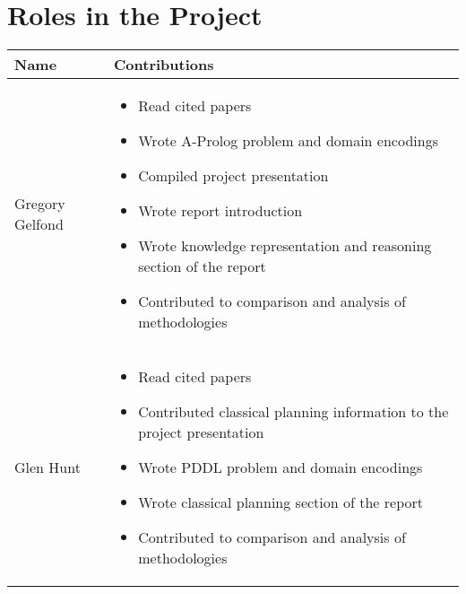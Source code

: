 \section{Roles in the Project}
\begin{tabularx}{\textwidth}{lX}
    \textbf{Name} & \textbf{Contributions} \\ \toprule
    Gregory Gelfond & \begin{itemize}
        \item Read cited papers
        \item Wrote A-Prolog problem and domain encodings
        \item Compiled project presentation
        \item Wrote report introduction
        \item Wrote knowledge representation and reasoning section of the report
        \item Contributed to comparison and analysis of methodologies
    \end{itemize} \\ \midrule
    Glen Hunt & \begin{itemize}
        \item Read cited papers
        \item Contributed classical planning information to the project presentation
        \item Wrote PDDL problem and domain encodings
        \item Wrote classical planning section of the report
        \item Contributed to comparison and analysis of methodologies 
    \end{itemize} \\ 
\end{tabularx}